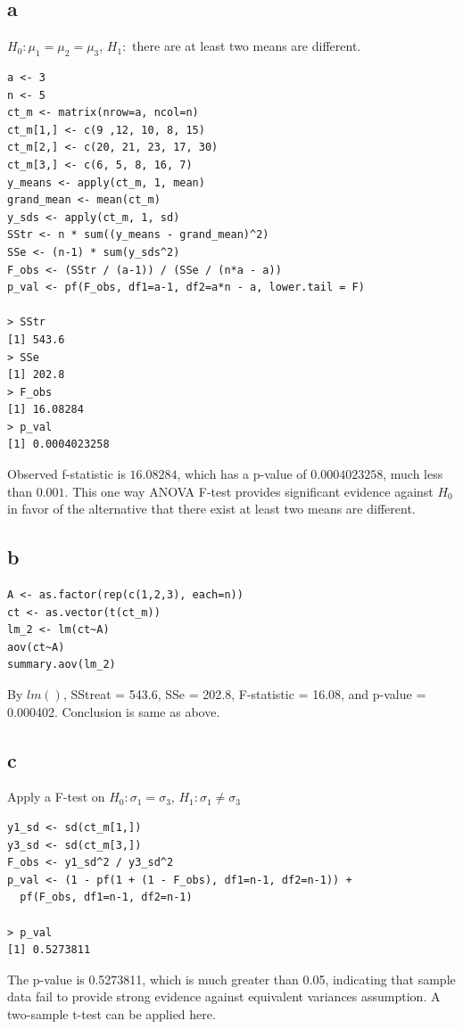 \documentclass[11pt,letterpaper]{article}
\begin{document}
\subsection*{a}
$H_0: \mu_1 = \mu_2 = \mu_3$, $H_1:$ there are at least two means are different. 
\begin{verbatim}
a <- 3
n <- 5
ct_m <- matrix(nrow=a, ncol=n)
ct_m[1,] <- c(9 ,12, 10, 8, 15)
ct_m[2,] <- c(20, 21, 23, 17, 30)
ct_m[3,] <- c(6, 5, 8, 16, 7)
y_means <- apply(ct_m, 1, mean)
grand_mean <- mean(ct_m)
y_sds <- apply(ct_m, 1, sd)
SStr <- n * sum((y_means - grand_mean)^2)
SSe <- (n-1) * sum(y_sds^2)
F_obs <- (SStr / (a-1)) / (SSe / (n*a - a))
p_val <- pf(F_obs, df1=a-1, df2=a*n - a, lower.tail = F)

> SStr
[1] 543.6
> SSe
[1] 202.8
> F_obs
[1] 16.08284
> p_val
[1] 0.0004023258
\end{verbatim}
\noindent Observed f-statistic is $16.08284$, which has a p-value of $0.0004023258$, much less than $0.001$. This one way ANOVA F-test provides significant evidence against $H_0$ in favor of the alternative that there exist at least two means are different. 

\subsection*{b}
\begin{verbatim}
A <- as.factor(rep(c(1,2,3), each=n))
ct <- as.vector(t(ct_m))
lm_2 <- lm(ct~A)
aov(ct~A)
summary.aov(lm_2)
\end{verbatim}
\noindent By $lm()$, SStreat = 543.6, SSe = 202.8, F-statistic = 16.08, and p-value = 0.000402. Conclusion is same as above. 

\subsection*{c}
\noindent Apply a F-test on $H_0: \sigma_1 = \sigma_3$, $H_1: \sigma_1 \neq \sigma_3$
\begin{verbatim}
y1_sd <- sd(ct_m[1,])
y3_sd <- sd(ct_m[3,])
F_obs <- y1_sd^2 / y3_sd^2
p_val <- (1 - pf(1 + (1 - F_obs), df1=n-1, df2=n-1)) +
  pf(F_obs, df1=n-1, df2=n-1)
  
> p_val
[1] 0.5273811
\end{verbatim}
\noindent The p-value is 0.5273811, which is much greater than 0.05, indicating that sample data fail to provide strong evidence against equivalent variances assumption. A two-sample t-test can be applied here. \\
\end{document}

